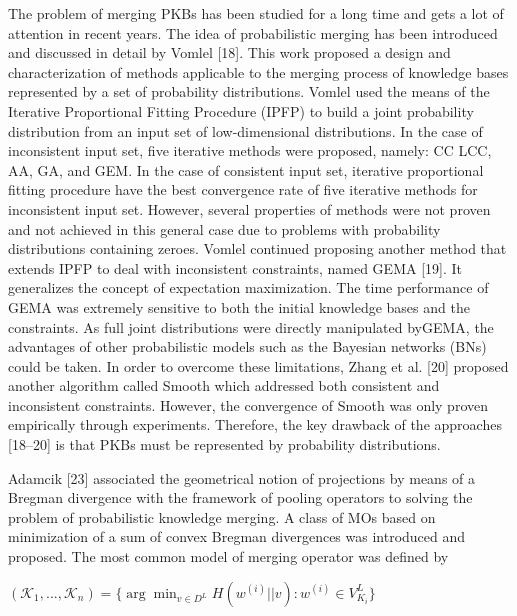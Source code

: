 \documentclass[10pt,a4paper]{IOS-Book-Article}
\begin{document}
The problem of merging PKBs has been studied for a long time and gets a lot of attention in recent years. The idea of probabilistic merging has been introduced and discussed in detail by Vomlel [18]. This work proposed a design and characterization of methods applicable to the merging process of knowledge bases represented by a set of probability distributions. Vomlel used the means of the Iterative Proportional Fitting Procedure (IPFP) to build a joint probability distribution from an input set of low-dimensional distributions. In the case of inconsistent input set, five iterative methods were proposed, namely: CC LCC, AA, GA, and GEM. In the case of consistent input set, iterative proportional fitting procedure have the best convergence rate of five iterative methods for inconsistent input set. However, several properties of methods were not proven and not achieved in this general case due to problems with probability distributions containing zeroes. Vomlel continued proposing another method that extends IPFP to deal with inconsistent constraints, named GEMA [19]. It generalizes the concept of expectation maximization. The time performance of GEMA was extremely sensitive to both the initial knowledge bases and the constraints. As full joint distributions were directly manipulated byGEMA, the advantages of other probabilistic models such as the Bayesian networks (BNs) could be taken. In order to overcome these limitations, Zhang et al. [20] proposed another algorithm called Smooth which addressed both consistent and inconsistent constraints. However, the convergence of Smooth was only proven empirically through experiments. Therefore, the key drawback of the approaches [18–20] is that PKBs must be represented by probability distributions. 

Adamcik [23] associated the geometrical notion of projections by means of a Bregman divergence with the framework of pooling operators to solving the problem of probabilistic knowledge merging. A class of MOs based on minimization of a sum of convex  Bregman divergences was introduced and proposed. The most common model of merging operator was defined by

$(\mathcal{K}_1, ... ,\mathcal{K}_n) = \{ \arg \min_{v \in D^L} H(w^{(i)}||v) : w^{(i)} \in V^L_{K_i}\}$
\end{document}
